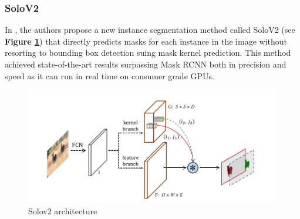 \documentclass[main.tex]{subfiles}
\begin{document}
\subsubsection{SoloV2}In \cite{Wang2020}, the authors propose a new instance segmentation method called SoloV2 (see \textbf{Figure \ref{fig:solo}}) that directly predicts masks for each instance in the image without resorting to bounding box detection suing mask kernel prediction. This method achieved state-of-the-art  results surpassing Mask RCNN both in precision and speed as it can run in real time on consumer grade GPUs.

\begin{figure}[H]
    \centering
    \includegraphics[width=12cm]{images/solov2.PNG}
    \caption{Solov2 architecture}
    \label{fig:solo}
\end{figure}
\end{document}
